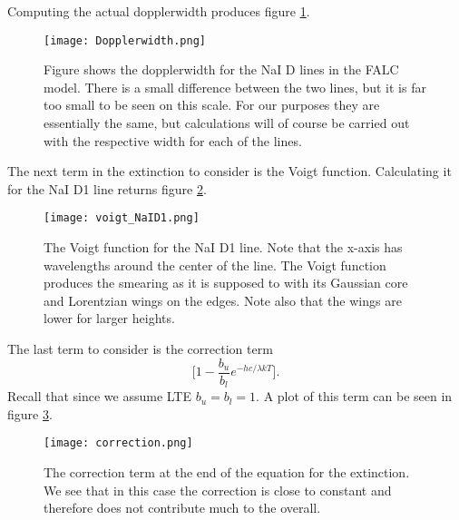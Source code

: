 \documentclass{aa}   %
\begin{document}
Computing the actual dopplerwidth produces figure \ref{Dopplerwidth}.
\begin{figure}
 \texttt{[image: Dopplerwidth.png]}
 \caption{Figure shows the dopplerwidth for the NaI D lines in the FALC model. There is a small difference between the two lines, but it is far too small to be seen on this scale. For our purposes they are essentially the same, but calculations will of course be carried out with the respective width for each of the lines.}
\label{Dopplerwidth}
\end{figure}

The next term in the extinction to consider is the Voigt function. Calculating it for the NaI D1 line returns figure \ref{voigt_NaID1}.
\begin{figure}
 \texttt{[image: voigt\_NaID1.png]}
 \caption{The Voigt function for the NaI D1 line. Note that the x-axis has wavelengths around the center of the line. The Voigt function produces the smearing as it is supposed to with its Gaussian core and Lorentzian wings on the edges. Note also that the wings are lower for larger heights. }
\label{voigt_NaID1}
\end{figure}

The last term to consider is the correction term
\begin{equation}
 \bigg[1-\frac{b_u}{b_l}e^{-hc/\lambda kT}\bigg].
\end{equation}
Recall that since we assume LTE $b_u =b_l=1$. A plot of this term can be seen in figure \ref{correction}.
\begin{figure}
 \texttt{[image: correction.png]}
 \caption{The correction term at the end of the equation for the extinction. We see that in this case the correction is close to constant and therefore does not contribute much to the overall.}
\label{correction}
\end{figure}
\end{document}
